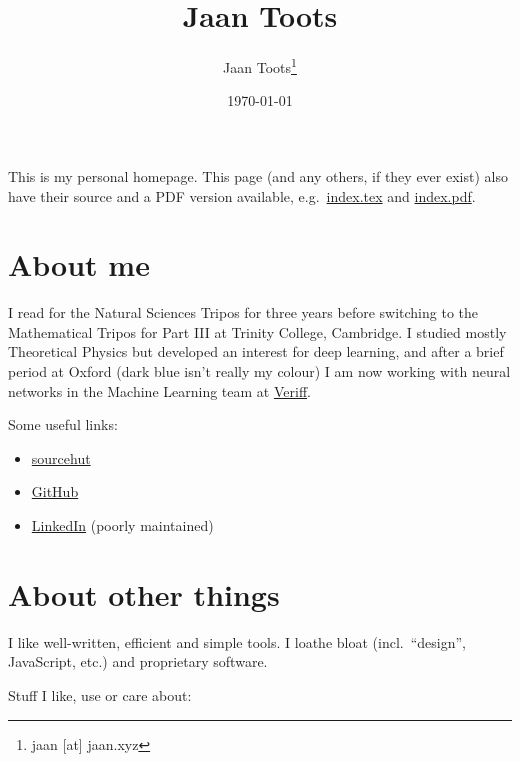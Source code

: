 \documentclass{article}
\title{Jaan Toots}
\author{Jaan Toots\footnote{jaan [at] jaan.xyz}}
\date{\today}
\begin{document}
\maketitle

This is my personal homepage. This page (and any others, if they ever exist)
also have their source and a PDF version available, e.g.\ \url{index.tex} and
\url{index.pdf}.

\section{About me}

I read for the Natural Sciences Tripos for three years before switching to the
Mathematical Tripos for Part III at Trinity College, Cambridge. I studied
mostly Theoretical Physics but developed an interest for deep learning, and
after a brief period at Oxford (dark blue isn't really my colour) I am now
working with neural networks in the Machine Learning team at
\href{https://veriff.me/}{Veriff}.

Some useful links:

\begin{itemize}
  \item \href{https://git.sr.ht/~jaan/}{sourcehut}
  \item \href{https://github.com/jaantoots}{GitHub}
  \item \href{https://www.linkedin.com/in/jaantoots/}{LinkedIn} (poorly
    maintained)
\end{itemize}

\section{About other things}

I like well-written, efficient and simple tools. I loathe bloat (incl.\
``design'', JavaScript, etc.) and proprietary software.

Stuff I like, use or care about:

\end{document}
